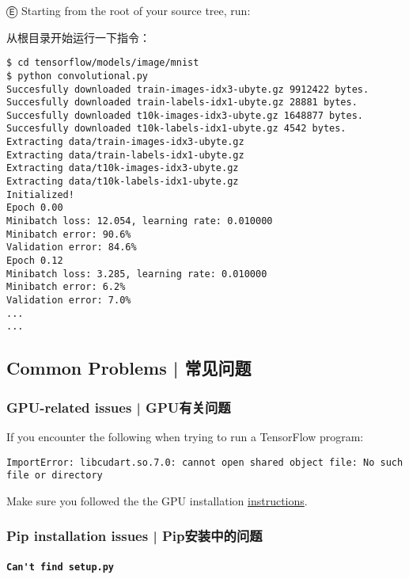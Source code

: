 Ⓔ \textcolor{etc}{Starting from the root of your source tree, run:}

从根目录开始运行一下指令：

\begin{lstlisting}
$ cd tensorflow/models/image/mnist
$ python convolutional.py
Succesfully downloaded train-images-idx3-ubyte.gz 9912422 bytes.
Succesfully downloaded train-labels-idx1-ubyte.gz 28881 bytes.
Succesfully downloaded t10k-images-idx3-ubyte.gz 1648877 bytes.
Succesfully downloaded t10k-labels-idx1-ubyte.gz 4542 bytes.
Extracting data/train-images-idx3-ubyte.gz
Extracting data/train-labels-idx1-ubyte.gz
Extracting data/t10k-images-idx3-ubyte.gz
Extracting data/t10k-labels-idx1-ubyte.gz
Initialized!
Epoch 0.00
Minibatch loss: 12.054, learning rate: 0.010000
Minibatch error: 90.6%
Validation error: 84.6%
Epoch 0.12
Minibatch loss: 3.285, learning rate: 0.010000
Minibatch error: 6.2%
Validation error: 7.0%
...
...
\end{lstlisting}


%

\subsection {Common Problems  |  常见问题} \label{comm_prob}

\subsubsection {GPU-related issues  |  GPU有关问题}

If you encounter the following when trying to run a TensorFlow program:

\begin{lstlisting}
ImportError: libcudart.so.7.0: cannot open shared object file: No such file or directory
\end{lstlisting}

Make sure you followed the the GPU installation \hyperref[install_cuda]{instructions}.

\subsubsection {Pip installation issues  |  Pip安装中的问题}

\paragraph{\lstinline{Can't find setup.py}}

